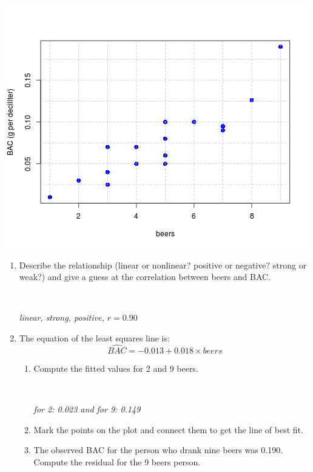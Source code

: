 \begin{enumerate}
\begin{minipage}{.35\linewidth}
  \end{minipage}\hfill
  \begin{minipage}{.60\linewidth}
    \includegraphics[width = \linewidth]{./plots/beer-BAC.png}
  \end{minipage}
\begin{enumerate}
  \item  Describe the relationship (linear or nonlinear? positive or
    negative? strong or weak?) and give a guess at the correlation
    between beers and BAC. 
\begin{students}
 \vspace{2cm}\\
\end{students}

\begin{key}
  {\it linear, strong, positive, $r = 0.90$ }
\end{key}

  \item The equation of the least squares line is:
  $$  \widehat{BAC} =  -0.013 + 0.018\times{beers}$$
  \begin{enumerate}
  \item Compute the fitted values for 2 and 9 beers.
\begin{students}
 \vspace{2cm}\\
\end{students}

\begin{key}
  {\it  for 2: 0.023  and for 9:  0.149}
\end{key}
   \item  Mark the points on the plot and connect them to get the line
     of best fit. \vspace{.2in}
   \item The observed BAC for the person who drank nine beers was 
     0.190. Compute the residual for the 9 beers person. 
\begin{students}
 \vspace{2cm}\\
\end{students}


\end{enumerate}
\end{enumerate}
\end{enumerate}
